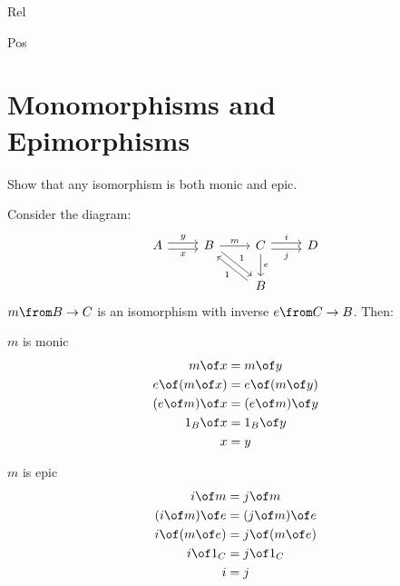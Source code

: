 \begin {definition}{Rel}
\begin{definition}{Pos}
\section{Monomorphisms and Epimorphisms}


\begin{exercise}
Show that any isomorphism is both monic and epic.
\end{exercise}

\begin{answer}
  Consider the diagram:
  \[
    \begin{tikzcd}
      A \arrow[r,shift left, "y"] \arrow[r,shift right,swap,"x"] &
      B \arrow[dr, shift left, "1"]  \arrow{r}{m}  &
      C \arrow{d}{e} \arrow[r,shift left, "i"] \arrow[r,shift right,swap,"j"] & D\\
     &  & B \arrow[ul, shift left, "1"]&
    \end{tikzcd}
  \]
  $m \from B \to C$ is an isomorphism with inverse $e \from C \to B$.
  Then:\\
  \begin{minipage}{.5\linewidth}
    \vspace{4mm}
    \centering $m$ is monic
    \[
      \begin{aligned}
        m \of x &= m \of y\\
        e \of (m \of x) &= e \of (m \of y)\\
        (e \of m) \of x &= (e \of m) \of y\\
        1_B \of x &= 1_B \of y\\
        x &= y
      \end{aligned}
    \]
  \end{minipage}%
  \begin{minipage}{.5\linewidth}
    \vspace{4mm}
    \centering $m$ is epic
    \[
      \begin{aligned}
        i \of m &= j \of m \\
        (i \of m) \of e &= (j \of m) \of e\\
        i \of (m \of e) &= j \of (m \of e)\\
        i \of 1_C &= j \of 1_C\\
        i &= j
      \end{aligned}
    \]

  \end{minipage}%
\end{answer}

\exercisesOnly{\newpage}


\end{definition}
\end{definition}

